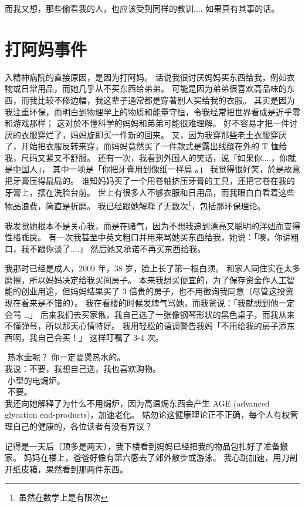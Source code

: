 \documentclass[12pt]{report}
\newcommand{\tab}{\hspace*{1cm}}
\newcommand*\dashh{\textemdash\,\,}
\begin{document}
而我又想，那些偷看我的人，也应该受到同样的教训.... 如果真有其事的话。

\chapter{打阿妈事件}

入精神病院的直接原因，是因为打阿妈。 话说我很讨厌妈妈买东西给我，例如衣物或日常用品，而她几乎从不买东西给弟弟。 可能是因为弟弟很喜欢高品味的东西，而我比较不修边幅，我这辈子通常都是穿著别人买给我的衣服。 其实是因为我注重环保，而明白到物理学上的物质和能量守恒，令我经常把世界看成是近乎零和游戏那样； 这对於不懂科学的妈妈和弟弟可能很难理解。 好不容易才把一件讨厌的衣服穿烂了，妈妈旋即买一件新的回来。 又，因为我穿那些老土衣服穿厌了，开始把衣服反转来穿，而妈妈竟然买了一件款式是露出线缝在外的 T 恤给我，尺码又紧又不舒服。 还有一次，我看到外国人的笑话，说「如果你....，你就是\underline{中国}人」， 其中一项是「你把牙膏用到像纸一样扁 。」 我觉得很好笑，於是故意把牙膏压得扁扁的。 谁知妈妈买了一个用卷轴挤压牙膏的工具，还把它卷在我的牙膏上，摆在洗脸台前。 世上有很多人不够衣服和日用品，而我眼白白看着这些物品浪费，简直是折磨。 我已经跟她解释了无数次\footnote{虽然在数学上是有限次}，包括那环保理论。

我发觉她根本不是关心我，而是在赌气，因为不想我追到漂亮又聪明的洋妞而变得性格乖戾。 有一次我甚至中英文粗口并用来骂她买东西给我，她说：「噢，你讲粗口，我不跟你谈了....」 然后她又承诺不再买东西给我。

我那时已经是成人，2009 年，38 岁，脸上长了第一根白须。 和家人同住实在太多磨擦，所以妈妈决定给我买间房子。 本来我想买便宜的，为了保存资金作人工智能的创业用途，但妈妈结果买了 3 倍贵的房子，也不用徵询我同意（尽管这投资现在看来是不错的）。 我在看楼的时候发脾气骂她，而我爸说：「我就想到他一定会骂 …」 后来我们去买家俬，我自己选了一张像钢琴形状的黑色桌子，而我从来不懂弹琴，所以那天心情特好。 我用轻松的语调警告我妈「不用给我的房子添东西啊，我自己会买！」 这样叮嘱了 3-4 次。

\tab \dashh 热水壶呢？ 你一定要煲热水的。\\
\tab 我说：不要，我想自己选，我也喜欢购物。\\
\tab \dashh 小型的电焗炉。\\
\tab \dashh 不要。\\
我还向她解释了为什么不用焗炉，因为高温焗东西会产生 AGE (advanced glycation end-products)，加速老化。 姑勿论这健康理论正不正确，每个人有权管理自己的健康的，各位读者有没有异议？

记得是一天后（顶多是两天），我下楼看到妈妈已经把我的物品包扎好了准备搬家。 妈妈在楼上，爸爸好像有第六感去了郊外散步或游泳。 我心跳加速，用刀剖开纸皮箱，果然看到那两件东西。
\end{document}
